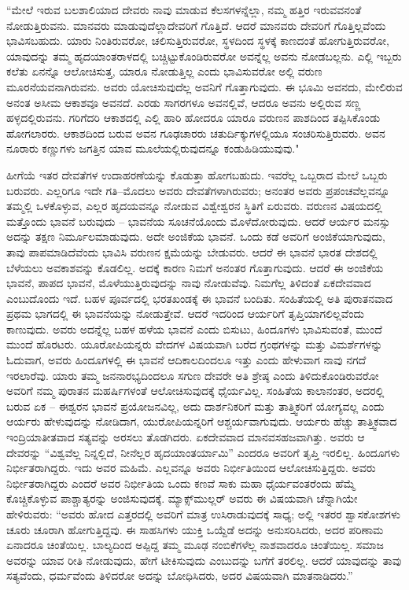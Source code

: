 “ಮೇಲೆ ಇರುವ ಬಲಶಾಲಿಯಾದ ದೇವರು ನಾವು ಮಾಡುವ ಕೆಲಸಗಳನ್ನೆಲ್ಲಾ, ನಮ್ಮ ಹತ್ತಿರ ಇರುವವನಂತೆ ನೋಡುತ್ತಿರುವನು. ಮಾನವರು ಮಾಡುವುದೆಲ್ಲಾ\break ದೇವರಿಗೆ ಗೊತ್ತಿದೆ. ಆದರೆ ಮಾನವರು ದೇವರಿಗೆ ಗೊತ್ತಿಲ್ಲವೆಂದು ಭಾವಿಸಬಹುದು. ಯಾರು ನಿಂತಿರುವರೋ, ಚಲಿಸುತ್ತಿರುವರೋ, ಸ್ಥಳದಿಂದ ಸ್ಥಳಕ್ಕೆ ಕಾಣದಂತೆ ಹೋಗುತ್ತಿರುವರೋ, ಯಾವುದನ್ನು ತಮ್ಮ ಹೃದಯಾಂತರಾಳದಲ್ಲಿ ಬಚ್ಚಿಟ್ಟುಕೊಂಡಿರುವರೋ ಅವನ್ನೆಲ್ಲ ಅವನು ನೋಡಬಲ್ಲನು. ಎಲ್ಲಿ ಇಬ್ಬರು ಕಲೆತು ಏನನ್ನೊ ಆಲೋಚಿಸುತ್ತ, ಯಾರೂ ನೋಡುತ್ತಿಲ್ಲ ಎಂದು ಭಾವಿಸುವರೋ ಅಲ್ಲಿ ವರುಣ ಮೂರನೆಯವನಾಗಿರುವನು. ಅವರು ಯೋಚಿಸುವುದೆಲ್ಲ ಅವನಿಗೆ ಗೊತ್ತಾಗುವುದು. ಈ ಭೂಮಿ ಅವನದು, ಮೇಲಿರುವ ಅನಂತ ಅಸೀಮ ಆಕಾಶವೂ ಅವನದೆ. ಎರಡು ಸಾಗರಗಳೂ ಅವನಲ್ಲಿವೆ, ಆದರೂ ಅವನು ಅಲ್ಲಿರುವ ಸಣ್ಣ ಹಳ್ಳದಲ್ಲಿರುವನು. ಗರಿಗೆದರಿ ಆಕಾಶದಲ್ಲಿ ಎಲ್ಲಿ ಹಾರಿ ಹೋದರೂ ಯಾರೂ ವರುಣನ ಪಾಶದಿಂದ ತಪ್ಪಿಸಿಕೊಂಡು ಹೋಗಲಾರರು. ಆಕಾಶದಿಂದ ಬರುವ ಅವನ ಗೂಢಚಾರರು ಚತುರ್ದಿಕ್ಕುಗಳಲ್ಲಿಯೂ ಸಂಚರಿಸುತ್ತಿರುವರು. ಅವನ ನೂರಾರು ಕಣ್ಣುಗಳು ಜಗತ್ತಿನ ಯಾವ ಮೂಲೆಯಲ್ಲಿರುವುದನ್ನೂ ಕಂಡುಹಿಡಿಯುವುವು."

ಹೀಗೆಯೆ ಇತರ ದೇವತೆಗಳ ಉದಾಹರಣೆಯನ್ನು ಕೊಡುತ್ತಾ ಹೋಗಬಹುದು. ಇವರೆಲ್ಲ ಒಬ್ಬರಾದ ಮೇಲೆ ಒಬ್ಬರು ಬರುವರು. ಎಲ್ಲರಿಗೂ ಇದೇ ಗತಿ–ಮೊದಲು ಅವರು ದೇವತೆಗಳಾಗಿರುವರು; ಅನಂತರ ಅವರು ಪ್ರಪಂಚವೆಲ್ಲವನ್ನೂ ತಮ್ಮಲ್ಲಿ ಒಳಕೊಳ್ಳುವ, ಎಲ್ಲರ ಹೃದಯವನ್ನೂ ನೋಡುವ ವಿಶ್ವೇಶ್ವರನ ಸ್ಥಿತಿಗೆ ಏರುವರು. ವರುಣನ ವಿಷಯದಲ್ಲಿ ಮತ್ತೊಂದು ಭಾವನೆ ಬರುವುದು – ಭಾವನೆಯ ಸೂಚನೆಯೊಂದು ಮೊಳೆದೋರುವುದು. ಆದರೆ ಆರ್ಯರ ಮನಸ್ಸು ಅದನ್ನು ತಕ್ಷಣ ನಿರ್ಮೂಲ\break ಮಾಡುವುದು. ಅದೇ ಅಂಜಿಕೆಯ ಭಾವನೆ. ಒಂದು ಕಡೆ ಅವರಿಗೆ ಅಂಜಿಕೆಯಾಗುವುದು, ತಾವು ಪಾಪಮಾಡಿದೆವೆಂದು ಭಾವಿಸಿ ವರುಣನ ಕ್ಷಮೆಯನ್ನು ಬೇಡುವರು. ಆದರೆ ಈ ಭಾವನೆ ಭಾರತ ದೇಶದಲ್ಲಿ ಬೆಳೆಯಲು ಅವಕಾಶವನ್ನು ಕೊಡಲಿಲ್ಲ. ಅದಕ್ಕೆ ಕಾರಣ ನಿಮಗೆ ಅನಂತರ ಗೊತ್ತಾಗುವುದು. ಆದರೆ ಈ ಅಂಜಿಕೆಯ ಭಾವನೆ, ಪಾಪದ ಭಾವನೆ, ಮೊಳೆಯುತ್ತಿರುವುದನ್ನು ನಾವು ನೋಡುವೆವು. ನಿಮಗೆಲ್ಲ ತಿಳಿದಂತೆ ಏಕದೇವವಾದ ಎಂಬುದೊಂದು ಇದೆ. ಬಹಳ ಪೂರ್ವದಲ್ಲಿ ಭರತಖಂಡಕ್ಕೆ ಈ ಭಾವನೆ ಬಂದಿತು. ಸಂಹಿತೆಯಲ್ಲಿ ಅತಿ ಪುರಾತನವಾದ ಪ್ರಥಮ ಭಾಗದಲ್ಲಿ ಈ ಭಾವನೆಯನ್ನು ನೋಡುತ್ತೇವೆ. ಆದರೆ ಇದರಿಂದ ಆರ್ಯರಿಗೆ ತೃಪ್ತಿಯಾಗಲಿಲ್ಲವೆಂದು ಕಾಣುವುದು. ಅವರು ಅದನ್ನೆಲ್ಲ ಬಹಳ ಹಳೆಯ ಭಾವನೆ ಎಂದು ಬಿಸುಟು, ಹಿಂದೂಗಳು ಭಾವಿಸುವಂತೆ, ಮುಂದೆ ಮುಂದೆ ಹೊರಟರು. ಯೂರೋಪಿಯನ್ನರು ವೇದಗಳ ವಿಷಯವಾಗಿ ಬರೆದ ಗ್ರಂಥಗಳನ್ನು ಮತ್ತು ವಿಮರ್ಶೆಗಳನ್ನು ಓದುವಾಗ, ಅವರು ಹಿಂದೂಗಳಲ್ಲಿ ಈ ಭಾವನೆ ಆದಿಕಾಲದಿಂದಲೂ ಇತ್ತು ಎಂದು ಹೇಳುವಾಗ ನಾವು ನಗದೆ ಇರಲಾರೆವು. ಯಾರು ತಮ್ಮ ಜನನಾರಭ್ಯದಿಂದಲೂ ಸಗುಣ ದೇವರೇ ಅತಿ ಶ್ರೇಷ್ಠ ಎಂದು ತಿಳಿದುಕೊಂಡಿರುವರೋ ಅವರಿಗೆ ನಮ್ಮ ಪುರಾತನ ಮಹರ್ಷಿಗಳಂತೆ ಆಲೋಚಿಸುವುದಕ್ಕೆ ಧೈರ್ಯವಿಲ್ಲ. ಸಂಹಿತೆಯ ಕಾಲಾನಂತರ, ಅದರಲ್ಲಿ ಬರುವ ಏಕ – ಈಶ್ವರನ ಭಾವನೆ ಪ್ರಯೋಜನವಿಲ್ಲ, ಅದು ದಾರ್ಶನಿಕರಿಗೆ ಮತ್ತು ತಾತ್ತ್ವಿಕರಿಗೆ ಯೋಗ್ಯವಲ್ಲ ಎಂದು ಆರ್ಯರು ಹೇಳುವುದನ್ನು ನೋಡಿದಾಗ, ಯುರೋಪಿಯನ್ನರಿಗೆ ಆಶ್ಚರ್ಯವಾಗುವುದು. ಆರ್ಯರು ಹೆಚ್ಚು ತಾತ್ತ್ವಿಕವಾದ ಇಂದ್ರಿಯಾತೀತವಾದ ಸತ್ಯವನ್ನು ಅರಸಲು ತೊಡಗಿದರು. ಏಕದೇವವಾದ ಮಾನವಸಹಜವಾಗಿತ್ತು. ಅವರು ಆ ದೇವರನ್ನು “ವಿಶ್ವವೆಲ್ಲ ನಿನ್ನಲ್ಲಿದೆ, ನೀನೆಲ್ಲರ ಹೃದಯಾಂತರ್ಯಾಮಿ” ಎಂದರೂ ಅವರಿಗೆ ತೃಪ್ತಿ ಇರಲಿಲ್ಲ. ಹಿಂದೂಗಳು ನಿರ್ಭೀತರಾಗಿದ್ದರು. ಇದು ಅವರ ಮಹಿಮೆ. ಎಲ್ಲವನ್ನೂ ಅವರು ನಿರ್ಭೀತಿಯಿಂದ ಆಲೋಚಿಸುತ್ತಿದ್ದರು. ಅವರು ನಿರ್ಭೀತರಾಗಿದ್ದರು ಎಂದರೆ ಅವರ ನಿರ್ಭೀತಿಯ ಒಂದು ಕಣವೆ ಸಾಕು ಮಹಾ ಧೈರ್ಯವಂತರೆಂದು ಹೆಮ್ಮೆ ಕೊಚ್ಚಿಕೊಳ್ಳುವ ಪಾಶ್ಚಾತ್ಯರನ್ನು ಅಂಜಿಸುವುದಕ್ಕೆ. ಮ್ಯಾಕ್ಸ್‌ಮುಲ್ಲರ್ ಅವರು ಈ ವಿಷಯವಾಗಿ ಚೆನ್ನಾಗಿಯೇ ಹೇಳಿರುವರು: “ಅವರು ಹೋದ ಎತ್ತರದಲ್ಲಿ ಅವರಿಗೆ ಮಾತ್ರ ಉಸಿರಾಡುವುದಕ್ಕೆ ಸಾಧ್ಯ; ಅಲ್ಲಿ ಇತರರ ಶ್ವಾಸಕೋಶಗಳು ಚೂರು ಚೂರಾಗಿ ಹೋಗುತ್ತಿದ್ದವು. ಈ ಸಾಹಸಿಗಳು ಯುಕ್ತಿ ಒಯ್ದೆಡೆ ಅದನ್ನು ಅನುಸರಿಸಿದರು, ಅದರ ಪರಿಣಾಮ ಏನಾದರೂ ಚಿಂತೆಯಿಲ್ಲ. ಬಾಲ್ಯದಿಂದ ಅಪ್ಪಿದ್ದ ತಮ್ಮ ಮೂಢ ನಂಬಿಕೆಗಳೆಲ್ಲ ನಾಶವಾದರೂ ಚಿಂತೆಯಿಲ್ಲ. ಸಮಾಜ ಅವರನ್ನು ಯಾವ ರೀತಿ ನೋಡುವುದು, ಹೇಗೆ ಟೀಕಿಸುವುದು ಎಂಬುದನ್ನು ಬಗೆಗೆ ತರಲಿಲ್ಲ. ಆದರೆ ಯಾವುದನ್ನು ತಾವು ಸತ್ಯವೆಂದು, ಧರ್ಮವೆಂದು ತಿಳಿದರೋ ಅದನ್ನು ಬೋಧಿಸಿದರು, ಅದರ ವಿಷಯವಾಗಿ ಮಾತನಾಡಿದರು.”

